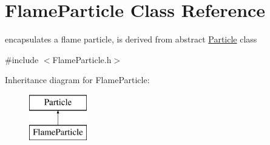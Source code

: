 \hypertarget{classFlameParticle}{\section{Flame\-Particle Class Reference}
\label{classFlameParticle}
}


encapsulates a flame particle, is derived from abstract \hyperlink{classParticle}{Particle} class  




{\ttfamily \#include $<$Flame\-Particle.\-h$>$}

Inheritance diagram for Flame\-Particle\-:\begin{figure}[H]
\begin{center}
\leavevmode
\includegraphics[height=2.000000cm]{classFlameParticle}
\end{center}
\end{figure}
